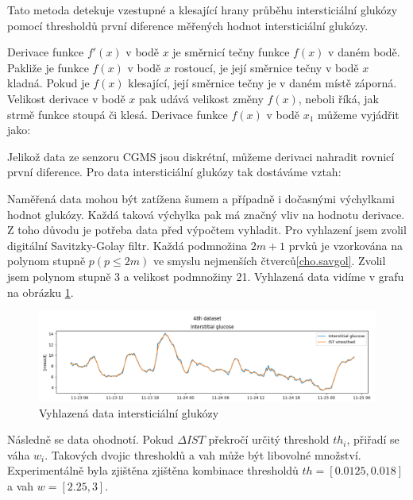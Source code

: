 Tato metoda detekuje vzestupné a klesající hrany průběhu intersticiální glukózy pomocí thresholdů první diference měřených hodnot intersticiální glukózy.

Derivace funkce $f'(x)$ v bodě $x$ je směrnicí tečny funkce $f(x)$ v daném bodě. Pakliže je funkce $f(x)$ v bodě $x$ rostoucí, je její směrnice tečny v bodě $x$ kladná. Pokud je $f(x)$ klesající, její směrnice tečny je v daném místě záporná. Velikost derivace v bodě $x$ pak udává velikost změny $f(x)$, neboli říká, jak strmě funkce stoupá či klesá. Derivace funkce $f(x)$ v bodě $x_{1}$ můžeme vyjádřit jako:


Jelikož data ze senzoru CGMS jsou diskrétní, můžeme derivaci nahradit rovnicí první diference. Pro data intersticiální glukózy tak dostáváme vztah:


Naměřená data mohou být zatížena šumem a případně i dočasnými výchylkami hodnot glukózy. Každá taková výchylka pak má značný vliv na hodnotu derivace. Z toho důvodu je potřeba data před výpočtem vyhladit. Pro vyhlazení jsem zvolil digitální Savitzky-Golay filtr. Každá podmnožina $2m+1$ prvků je vzorkována na polynom stupně $p (p\leq 2m)$ ve smyslu nejmenších čtverců\ref{cho.savgol}. Zvolil jsem polynom stupně 3 a velikost podmnožiny 21. Vyhlazená data vidíme v grafu na obrázku \ref{fig:savgol}.

\begin{figure}[H]
\caption{Vyhlazená data intersticiální glukózy}
\label{fig:savgol}
\centering
\includegraphics[width=1\textwidth]{img/cho/savgol.png}
\end{figure}

Následně se data ohodnotí. Pokud $\Delta IST$ překročí určitý threshold $th_{i}$, přiřadí se váha $w_{i}$. Takových dvojic thresholdů a vah může být libovolné množství. Experimentálně byla zjištěna zjištěna kombinace thresholdů $th=[0.0125, 0.018]$ a vah $w=[2.25, 3]$.

